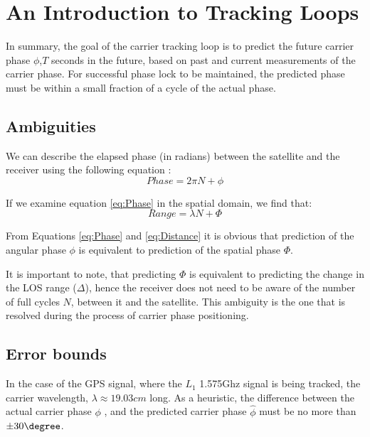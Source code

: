 
\chapter{An Introduction to Tracking Loops}
\label{ch:TrackingLoops}
In summary, the goal of the carrier tracking loop is to predict the future carrier phase $\phi$,$T$ seconds in the future, based on past and current measurements of the carrier phase. For successful phase lock to be maintained, the predicted phase must be within a small fraction of a cycle of the actual phase. 

\section{Ambiguities}

We can describe the elapsed phase (in radians) between the satellite and the receiver using the following equation :  
\begin{equation}
Phase = 2 \pi N  + \phi 
\label{eq:Phase}
\end{equation}

If we examine equation \ref{eq:Phase} in the spatial domain, we find that: 
\begin{equation}
Range = \lambda N + \Phi
\label{eq:Distance}
\end{equation}

From Equations \ref{eq:Phase} and \ref{eq:Distance} it is obvious that prediction of the angular phase $\phi$ is equivalent to prediction of the spatial phase $\Phi$.

It is important to note, that predicting $\Phi$ is equivalent to predicting the change in the LOS range ($\Delta$), hence the receiver does not need to be aware of the number of full cycles $N$, between it and the satellite. This ambiguity is the one that is resolved during the process of carrier phase positioning. 

\section{Error bounds}
In the case of the GPS signal, where the $L_1$ 1.575Ghz signal is being tracked, the carrier wavelength, $\lambda \approx 19.03 cm$ long. As a heuristic, the difference between the actual carrier phase $\phi$ , and the predicted carrier phase $\hat{\phi}$ must be no more than $\pm30 \degree$. 

